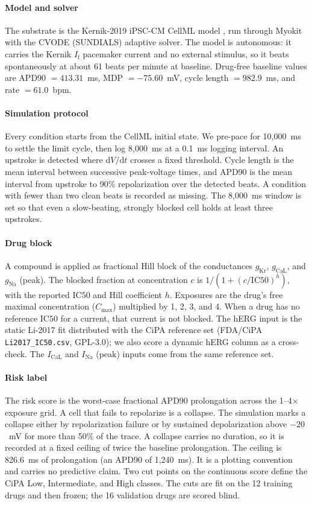 \documentclass[preprint,12pt]{elsarticle}
\begin{document}
\paragraph{Model and solver}
The substrate is the Kernik-2019 iPSC-CM CellML model \cite{kernik2019}, run through
Myokit with the CVODE (SUNDIALS) adaptive solver. The model is autonomous: it carries
the Kernik $I_{\mathrm{f}}$ pacemaker current and no external stimulus, so it beats
spontaneously at about 61 beats per minute at baseline. Drug-free baseline values are
APD90 $= 413.31$~ms, MDP $= -75.60$~mV, cycle length $= 982.9$~ms, and rate
$= 61.0$~bpm.

\paragraph{Simulation protocol}
Every condition starts from the CellML initial state. We pre-pace for 10{,}000~ms to
settle the limit cycle, then log 8{,}000~ms at a 0.1~ms logging interval. An upstroke is
detected where $\mathrm{d}V/\mathrm{d}t$ crosses a fixed threshold. Cycle length is the mean
interval between successive peak-voltage times, and APD90 is the mean interval from
upstroke to 90\% repolarization over the detected beats. A condition with fewer
than two clean beats is recorded as missing. The 8{,}000~ms window is set so that even a
slow-beating, strongly blocked cell holds at least three upstrokes.

\paragraph{Drug block}
A compound is applied as fractional Hill block of the conductances
$g_{\mathrm{Kr}}$, $g_{\mathrm{CaL}}$, and $g_{\mathrm{Na}}$ (peak). The blocked fraction
at concentration $c$ is $1/(1+(c/\mathrm{IC50})^{h})$, with the reported $\mathrm{IC50}$
and Hill coefficient $h$. Exposures are the drug's free maximal concentration
($C_{\mathrm{max}}$) multiplied by 1, 2, 3, and 4. When a drug has no reference
$\mathrm{IC50}$ for a current, that current is not blocked. The hERG input is the static
Li-2017 fit distributed with the CiPA reference set (FDA/CiPA
\texttt{Li2017\_IC50.csv}, GPL-3.0); we also score a dynamic hERG column as a
cross-check. The $I_{\mathrm{CaL}}$ and $I_{\mathrm{Na}}$ (peak) inputs come from the
same reference set.

\paragraph{Risk label}
The risk score is the worst-case fractional APD90 prolongation across the 1--4$\times$
exposure grid. A cell that fails to repolarize is a collapse. The simulation marks a collapse
either by repolarization failure or by sustained depolarization above $-20$~mV for more than 50\%
of the trace. A collapse carries no duration, so it is recorded at a fixed ceiling of
twice the baseline prolongation. The ceiling is 826.6~ms of prolongation (an APD90 of
1{,}240~ms). It is a plotting convention and carries no predictive claim. Two cut points
on the
continuous score define the CiPA Low, Intermediate, and High classes. The cuts are fit on
the 12 training drugs and then frozen; the 16 validation drugs are scored blind.
\end{document}
